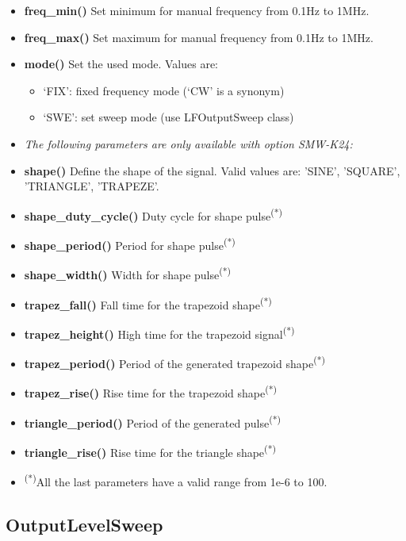 \documentclass[11pt]{article} %
\begin{document}
\begin{itemize}
\item {\bf freq\_min()} Set minimum for manual frequency from 0.1Hz to 1MHz.
\item {\bf freq\_max()} Set maximum for manual frequency from 0.1Hz to 1MHz.
\item {\bf mode()} Set the used mode. Values are:
	\begin{itemize}[]
	\item `FIX': fixed frequency mode (`CW' is a synonym)
	\item `SWE': set sweep mode (use LFOutputSweep class)
	\end{itemize}
\item[] {\it The following parameters are only available with option SMW-K24:}
\item {\bf shape()} Define the shape of the signal. Valid values are: 'SINE', 'SQUARE', 'TRIANGLE', 'TRAPEZE'.
\item {\bf shape\_duty\_cycle()} Duty cycle for shape pulse\textsuperscript{(*)}
\item {\bf shape\_period()} Period for shape pulse\textsuperscript{(*)}
\item {\bf shape\_width()} Width for shape pulse\textsuperscript{(*)}
\item {\bf trapez\_fall()} Fall time for the trapezoid shape\textsuperscript{(*)}
\item {\bf trapez\_height()} High time for the trapezoid signal\textsuperscript{(*)}
\item {\bf trapez\_period()} Period of the generated trapezoid shape\textsuperscript{(*)}
\item {\bf trapez\_rise()} Rise time for the trapezoid shape\textsuperscript{(*)}
\item {\bf triangle\_period()} Period of the generated pulse\textsuperscript{(*)}
\item {\bf triangle\_rise()} Rise time for the triangle shape\textsuperscript{(*)}
\item[] \textsuperscript{(*)}All the last parameters have a valid range from 1e-6 to 100.
\end{itemize}


\subsection{OutputLevelSweep}
\end{document}
